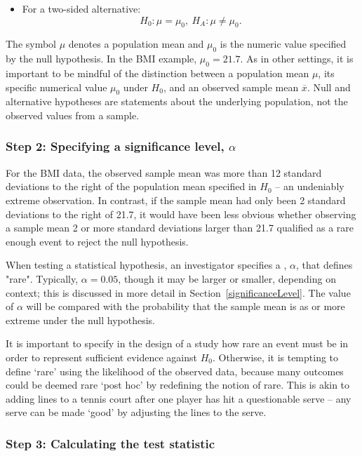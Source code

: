\begin{spacing}{1.5}
\begin{itemize}
	\item For a two-sided alternative: \[H_0: \mu = \mu_0, \ H_A: \mu \neq \mu_0.\]
\end{itemize}


The symbol $\mu$ denotes a population mean and $\mu_0$ is the numeric value specified by  the null hypothesis. In the BMI example, $\mu_0 = 21.7$.  As in other settings, it is important to be mindful of the distinction between a population mean $\mu$, its specific numerical value $\mu_0$ under $H_0$,  and an observed sample mean $\overline{x}$.  Null and alternative hypotheses are statements about the underlying population, not the observed values from a sample.

\subsubsection{Step 2: Specifying a significance level, $\alpha$}

For the  BMI data, the observed sample mean was more than 12 standard deviations to the right of the population mean specified in $H_0$ -- an undeniably extreme observation. In contrast, if the sample mean had only been 2 standard deviations to the right of 21.7, it would have been less obvious whether observing a sample mean 2 or more standard deviations larger than 21.7 qualified as a rare enough event to reject the null hypothesis. 

When testing a statistical hypothesis, an investigator specifies a , $\alpha$, that defines "rare". Typically, $\alpha = 0.05$, though it may be larger or smaller, depending on context; this is discussed in more detail in Section~\ref{significanceLevel}. The value of $\alpha$ will be compared with the probability that the sample mean is as or more extreme under the null hypothesis.

It is important to specify in the design of a study how rare an event must be in order to represent sufficient evidence against $H_0$.  Otherwise, it is tempting to define `rare' using the likelihood of the observed data, because many outcomes could be deemed rare `post hoc' by redefining the notion of rare.  This is akin to adding lines to a tennis court after one player has hit a questionable serve -- any serve can be made `good' by adjusting the lines to the serve. 

\subsubsection{Step 3: Calculating the test statistic}


\end{spacing}
